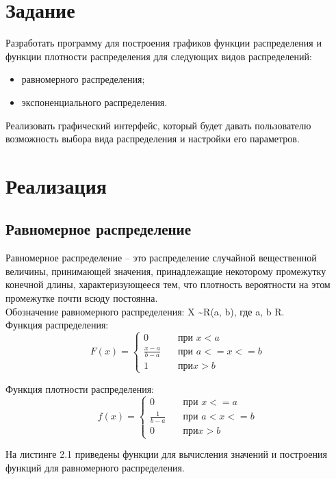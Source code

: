 \documentclass[12pt]{report}
\begin{document}
\chapter{Задание}
Разработать программу для построения графиков функции распределения и функции плотности распределения для следующих видов распределений:
\begin{itemize}
    \item равномерного распределения;
    \item экспоненциального распределения.
\end{itemize}
Реализовать графический интерфейс, который будет давать пользователю возможность выбора вида распределения и настройки его параметров.

\chapter{Реализация}
\section{Равномерное распределение}
Равномерное распределение -- это распределение случайной вещественной величины, принимающей значения, принадлежащие некоторому промежутку конечной длины, характеризующееся тем, что плотность вероятности на этом промежутке почти всюду постоянна.\\

Обозначение равномерного распределения: X \sim R(a, b), где a, b \in R.\\

Функция распределения:
\[ F(x) =
  \begin{cases}
    0       & \quad \text{при } x < a\\
    \frac{x - a}{b - a}  & \quad \text{при } a <= x <= b\\
    1       & \quad \text{при} x > b
  \end{cases}
\]

Функция плотности распределения:
\[ f(x) =
  \begin{cases}
    0       & \quad \text{при } x <= a\\
    \frac{1}{b - a}  & \quad \text{при } a < x <= b\\
    0       & \quad \text{при} x > b
  \end{cases}
\]

На листинге 2.1 приведены функции для вычисления значений и построения функций для равномерного распределения.
\end{document}
